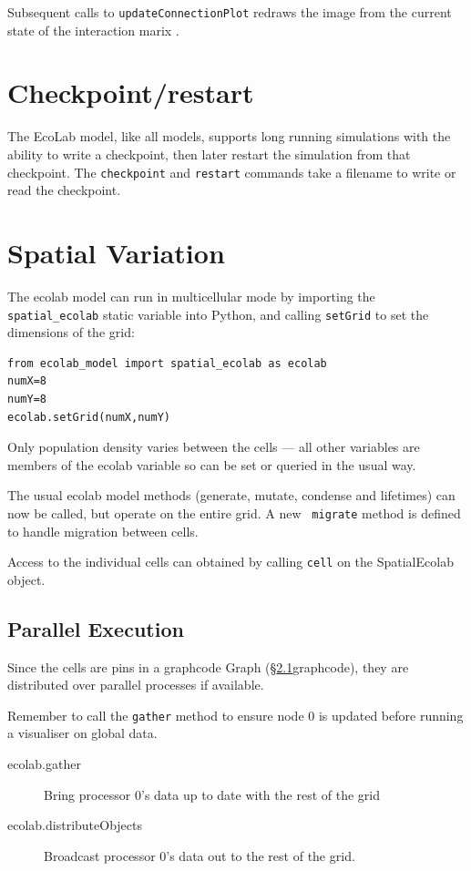 \documentclass{article}
\newcommand{\bbeta}{\mbox{\boldmath{$\beta$}}}   %
\newcommand{\EcoLab}{{\sffamily\slshape
    \mbox{\raisebox{.5ex}{Eco}\hspace{-.4em}{\makebox[.5em]{L}ab}}}}
\begin{document}
Subsequent calls to \verb+updateConnectionPlot+ redraws the image from
the current state of the interaction marix \bbeta.

\section{Checkpoint/restart}

The EcoLab model, like all \EcoLab{} models, supports long running
simulations with the ability to write a checkpoint, then later restart
the simulation from that checkpoint. The \verb+checkpoint+ and
\verb+restart+ commands take a filename to write or read the
checkpoint.

\section{Spatial Variation}\label{spatial}

The ecolab model can run in multicellular mode by importing the
\verb+spatial_ecolab+ static variable into Python, and calling
\verb+setGrid+ to set the dimensions of the grid:
\begin{verbatim}
from ecolab_model import spatial_ecolab as ecolab
numX=8
numY=8
ecolab.setGrid(numX,numY)
\end{verbatim}

Only population density varies between the cells --- all other
variables are members of the ecolab variable so can be set or queried
in the usual way.

The usual ecolab model methods (generate, mutate, condense and
lifetimes)
can now be called, but operate on the entire grid. A new {\tt
migrate} method is defined to handle migration between
cells.

Access to the individual cells can obtained by calling \verb+cell+ on
the SpatialEcolab object.

\subsection{Parallel Execution}

Since the cells are pins in a graphcode Graph (\S\ref{}{graphcode}),
they are distributed over parallel processes if available.

Remember to call the \verb+gather+ method to ensure node
0 is updated before running a visualiser on global data.

\begin{description}
\item[ecolab.gather] Bring processor 0's data up to date with the rest
  of the grid
\item[ecolab.distributeObjects] Broadcast processor 0's data out to the
  rest of the grid.
\end{description}
\end{document}
